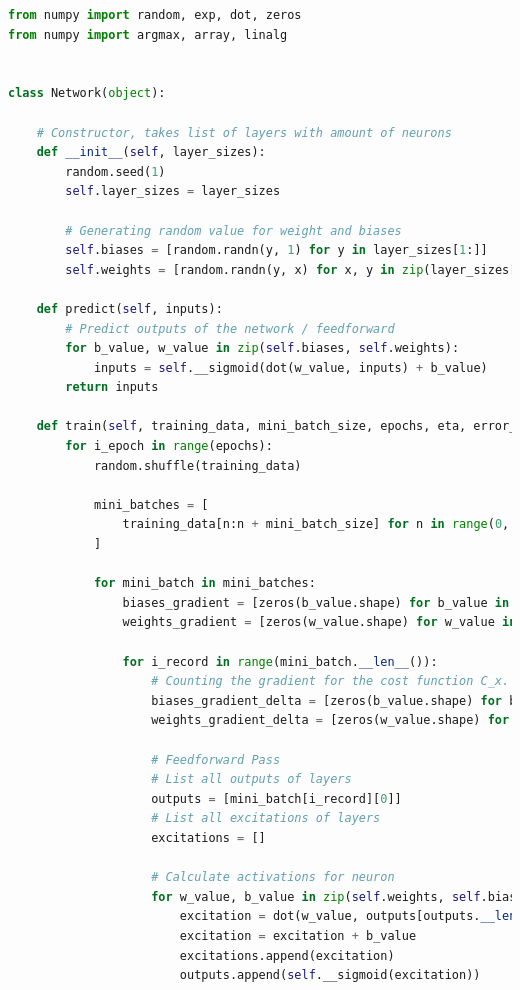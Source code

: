 \documentclass[12pt,twoside]{article}
\begin{document}
\begin{lstlisting}[caption={Plik klasy Network - network.py},label={Lst:network_py},language=Python,basicstyle=\scriptsize]
from numpy import random, exp, dot, zeros
from numpy import argmax, array, linalg


class Network(object):

    # Constructor, takes list of layers with amount of neurons
    def __init__(self, layer_sizes):
        random.seed(1)
        self.layer_sizes = layer_sizes

        # Generating random value for weight and biases
        self.biases = [random.randn(y, 1) for y in layer_sizes[1:]]
        self.weights = [random.randn(y, x) for x, y in zip(layer_sizes[:-1], layer_sizes[1:])]

    def predict(self, inputs):
        # Predict outputs of the network / feedforward
        for b_value, w_value in zip(self.biases, self.weights):
            inputs = self.__sigmoid(dot(w_value, inputs) + b_value)
        return inputs

    def train(self, training_data, mini_batch_size, epochs, eta, error_target, test_data=None):
        for i_epoch in range(epochs):
            random.shuffle(training_data)

            mini_batches = [
                training_data[n:n + mini_batch_size] for n in range(0, training_data.__len__(), mini_batch_size)
            ]

            for mini_batch in mini_batches:
                biases_gradient = [zeros(b_value.shape) for b_value in self.biases]
                weights_gradient = [zeros(w_value.shape) for w_value in self.weights]

                for i_record in range(mini_batch.__len__()):
                    # Counting the gradient for the cost function C_x.
                    biases_gradient_delta = [zeros(b_value.shape) for b_value in self.biases]
                    weights_gradient_delta = [zeros(w_value.shape) for w_value in self.weights]

                    # Feedforward Pass
                    # List all outputs of layers
                    outputs = [mini_batch[i_record][0]]
                    # List all excitations of layers
                    excitations = []

                    # Calculate activations for neuron
                    for w_value, b_value in zip(self.weights, self.biases):
                        excitation = dot(w_value, outputs[outputs.__len__() - 1])
                        excitation = excitation + b_value
                        excitations.append(excitation)
                        outputs.append(self.__sigmoid(excitation))


\end{lstlisting}
\end{document}
